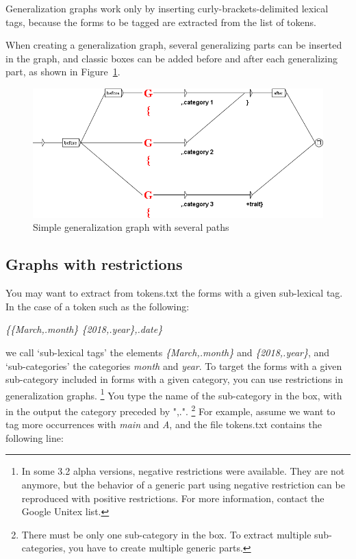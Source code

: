 \bigskip
\noindent Generalization graphs work only by inserting
curly-brackets-delimited lexical tags, because the forms to be tagged are extracted from the list of tokens.

\bigskip
\noindent When creating a generalization graph, several generalizing parts can be inserted in the graph, and
classic boxes can be added before and after each generalizing part, as shown in
Figure~\ref{fig:graphe_gener_plusieurs_chemins}.

\begin{figure}[!htb]
  \centering
  \includegraphics[width=14cm]{resources/img/graphe_generique_plusieurs_chemins.png}
  \caption{Simple generalization graph with several paths}
  \label{fig:graphe_gener_plusieurs_chemins}
\end{figure}

\subsection{Graphs with restrictions}

You may want to extract from tokens.txt the forms with a given sub-lexical tag. In the case of a token such as the following:

\bigskip
\emph{\{\{March,.month\} \{2018,.year\},.date\}}

\bigskip
\noindent we call `sub-lexical tags' the elements \emph{\{March,.month\}} and \emph{\{2018,.year\}}, and `sub-categories' the categories \textit{month} and \textit{year}.
To target the forms with a given sub-category included in forms with a given category, you can use restrictions
in generalization graphs. \footnote{ In some 3.2 alpha versions,
negative restrictions were available. They are not anymore, but the behavior of a generic part using
negative restriction can be reproduced with positive restrictions. For more information, contact the
Google Unitex list.} You type the name of the sub-category in the box, with in the output the category preceded
by ",.". \footnote{ There must be only one sub-category in the box. To extract multiple sub-categories, 
you have to create multiple generic parts.} For example, assume we want to tag more occurrences
with \textit{main} and \textit{A}, and the file tokens.txt contains the following line:

